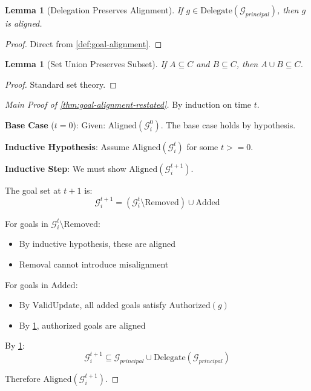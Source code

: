 \documentclass[
]{article}
\newtheorem{lemma}[theorem]{Lemma}
\begin{document}
\begin{lemma}[Delegation Preserves Alignment]
\label{lem:delegation-preserves}
If $g \in \text{Delegate}(\mathcal{G}_{principal})$, then $g$ is aligned.
\end{lemma}

\begin{proof}
Direct from \cref{def:goal-alignment}.
\end{proof}

\begin{lemma}[Set Union Preserves Subset]
\label{lem:union-preserves}
If $A \subseteq C$ and $B \subseteq C$, then $A \cup B \subseteq C$.
\end{lemma}

\begin{proof}
Standard set theory.
\end{proof}

\begin{proof}[Main Proof of \cref{thm:goal-alignment-restated}]
By induction on time $t$.

\textbf{Base Case} ($t = 0$): Given: $\text{Aligned}(\mathcal{G}_i^0)$. The base case holds by hypothesis.

\textbf{Inductive Hypothesis}: Assume $\text{Aligned}(\mathcal{G}_i^t)$ for some $t >= 0$.

\textbf{Inductive Step}: We must show $\text{Aligned}(\mathcal{G}_i^{t+1})$.

The goal set at $t+1$ is:
\begin{equation}
\label{eq:63-step-1}
\mathcal{G}_i^{t+1} = (\mathcal{G}_i^t \setminus \text{Removed}) \cup \text{Added}
\end{equation}

For goals in $\mathcal{G}_i^t \setminus \text{Removed}$:
\begin{itemize}
\item By inductive hypothesis, these are aligned
\item Removal cannot introduce misalignment
\end{itemize}

For goals in $\text{Added}$:
\begin{itemize}
\item By $\text{ValidUpdate}$, all added goals satisfy $\text{Authorized}(g)$
\item By \cref{lem:delegation-preserves}, authorized goals are aligned
\end{itemize}

By \cref{lem:union-preserves}:
\begin{equation}
\label{eq:63-step-2}
\mathcal{G}_i^{t+1} \subseteq \mathcal{G}_{principal} \cup \text{Delegate}(\mathcal{G}_{principal})
\end{equation}

Therefore $\text{Aligned}(\mathcal{G}_i^{t+1})$.
\end{proof}
\end{document}
